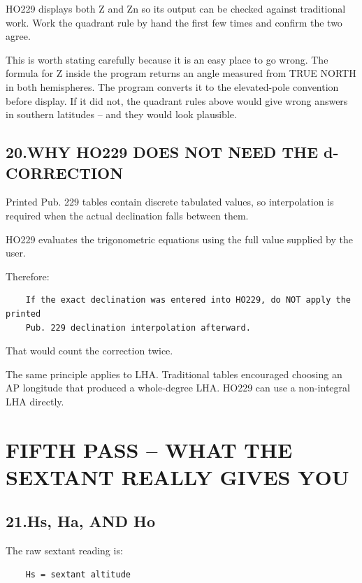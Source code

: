 \documentclass[11pt]{article}
\begin{document}
HO229 displays both Z and Zn so its output can be checked against traditional work. Work the quadrant rule by hand the first few times and confirm the two agree.

This is worth stating carefully because it is an easy place to go wrong. The formula for Z inside the program returns an angle measured from TRUE NORTH in both hemispheres. The program converts it to the elevated-pole convention before display. If it did not, the quadrant rules above would give wrong answers in southern latitudes -- and they would look plausible.

\subsection*{20.\quad WHY HO229 DOES NOT NEED THE d-CORRECTION}

Printed Pub. 229 tables contain discrete tabulated values, so interpolation is required when the actual declination falls between them.

HO229 evaluates the trigonometric equations using the full value supplied by the user.

Therefore:

\begin{verbatim}
    If the exact declination was entered into HO229, do NOT apply the printed
    Pub. 229 declination interpolation afterward.
\end{verbatim}

That would count the correction twice.

The same principle applies to LHA. Traditional tables encouraged choosing an AP longitude that produced a whole-degree LHA. HO229 can use a non-integral LHA directly.

\section*{FIFTH PASS -- WHAT THE SEXTANT REALLY GIVES YOU}

\subsection*{21.\quad Hs, Ha, AND Ho}

The raw sextant reading is:

\begin{verbatim}
    Hs = sextant altitude
\end{verbatim}
\end{document}
